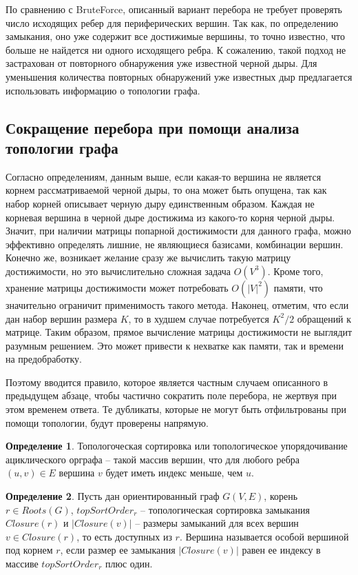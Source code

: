 \documentclass[12pt,a4paper,oneside,openany]{article}
\theoremstyle{definition}
\newtheorem{definition}{Определение}[]
\theoremstyle{lemma}
\theoremstyle{remark}
\begin{document}
По сравнению с BruteForce, описанный вариант перебора не требует проверять число исходящих ребер для периферических вершин.
Так как, по определению замыкания, оно уже содержит все достижимые вершины, то точно известно, что больше не найдется ни одного
исходящего ребра.
К сожалению, такой подход не застрахован от повторного обнаружения уже известной черной дыры.
Для уменьшения количества повторных обнаружений уже известных дыр предлагается
использовать информацию о топологии графа.

\subsection{Сокращение перебора при помощи анализа топологии графа}

Согласно определениям, данным выше, если какая-то вершина не является корнем рассматриваемой черной дыры,
то она может быть опущена, так как набор корней описывает черную дыру единственным образом.
Каждая не корневая вершина в черной дыре достижима из какого-то корня черной дыры.
Значит, при наличии матрицы попарной достижимости для данного графа,
можно эффективно определять лишние, не являющиеся базисами, комбинации вершин.
Конечно же, возникает желание сразу же вычислить такую матрицу достижимости,
но это вычислительно сложная задача $O(V^3)$.
Кроме того, хранение матрицы достижимости может потребовать $O(|V|^2)$ памяти, что значительно ограничит применимость такого метода.
Наконец, отметим, что если дан набор вершин размера $K$, то в худшем случае потребуется $K^2/2$ обращений к матрице.
Таким образом, прямое вычисление матрицы достижимости не выглядит разумным решением.
Это может привести к нехватке как памяти, так и времени на предобработку.

Поэтому вводится правило, которое является частным случаем описанного в предыдущем абзаце,
чтобы частично сократить поле перебора, не жертвуя при этом временем ответа.
Те дубликаты, которые не могут быть отфильтрованы при помощи топологии, будут проверены напрямую.

\begin{definition}
Топологоческая сортировка или топологическое упорядочивание ациклического орграфа -- такой массив вершин, что для любого ребра $(u,v) \in E$ вершина $v$ будет иметь индекс меньше, чем $u$.
\end{definition}

\begin{definition}\label{def:specialnode}
Пусть дан ориентированный граф $G(V,E)$, корень $r \in Roots(G)$, $topSortOrder_r$ --
топологическая сортировка замыкания $Closure(r)$ и $|Closure(v)|$ --
размеры замыканий для всех вершин $v \in Closure(r)$, то есть доступных из $r$.
Вершина называется особой вершиной под корнем $r$, если размер ее замыкания $|Closure(v)|$ равен ее индексу в массиве $topSortOrder_r$ плюс один.
\end{definition}
\end{document}
